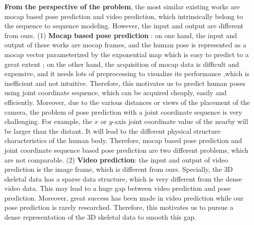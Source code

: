 \documentclass[journal]{IEEEtran}
\begin{document}
{\bf From the perspective of the problem}, the most similar existing works are mocap based pose prediction and video prediction, which intrinsically belong to the sequence to sequence modeling. However, the input and output are different from ours. (1) {\bf Mocap based pose prediction} \cite{MartinezOMP,tprnn,rnmhy,srnnap}: on one hand, the input and output of these works are mocap frames, and the human pose is represented as a mocap vector parameterized by the exponential map which is easy to predict to a great extent \cite{ppruem,TaylorMM,h36m}; on the other hand, the acquisition of mocap data is difficult and expensive, and it needs lots of preprocessing to visualize its performance \cite{TaylorMM,MartinezOMP},which is inefficient and not intuitive. Therefore, this motivates us to predict human poses using joint coordinate sequence, which can be acquired cheaply, easily and efficiently. Moreover, due to the various distances or views of the placement of the camera, the problem of pose prediction with a joint coordinate sequence is very challenging. For example, the ${x}$ or ${y}$-axis joint coordinate value of the nearby will be larger than the distant. It will lead to the different physical structure characteristics of the human body. Therefore, mocap based pose prediction and joint coordinate sequence based pose prediction are two different problems, which are not comparable. (${2}$) {\bf Video prediction}: the input and output of video prediction is the image frame, which is different from ours. Specially, the 3D skeletal data has a sparse data structure, which is very different from the dense video data. This may lead to a huge gap between video prediction and pose prediction. Moreover, great success has been made in video prediction \cite{predcnn,fstvp,ld2rvp,sv2p,ptmois,bbsptb} while our pose prediction is rarely researched. Therefore, this motivates us to pursue a dense representation of the 3D skeletal data to smooth this gap.
\end{document}
